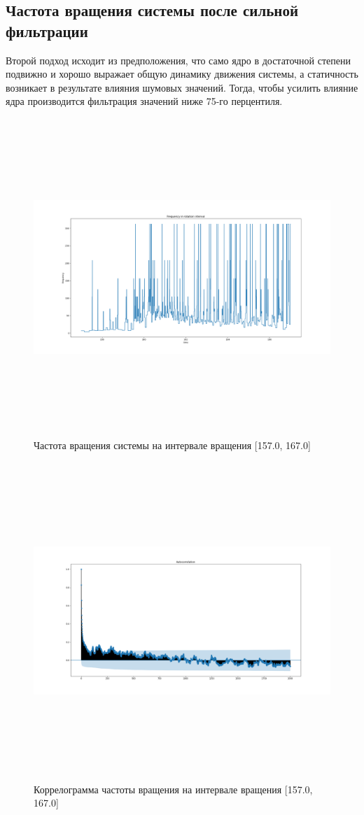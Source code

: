 \documentclass[a4paper,12pt]{article} %
\begin{document}
	\subsection{Частота вращения системы после сильной фильтрации}
	Второй подход исходит из предположения, что само ядро в достаточной степени подвижно и хорошо выражает общую динамику движения системы, а статичность возникает в результате влияния шумовых значений. Тогда, чтобы усилить влияние ядра производится  фильтрация значений ниже 75-го перцентиля.
	\begin{figure}[H]
		\includegraphics[width = 18cm, height = 12cm]{Rot_filtered.png}
		\caption{Частота вращения системы на интервале вращения [157.0, 167.0]}
		\label{fig:rot_filtered}
	\end{figure}

	\begin{figure}[H]
		\includegraphics[width = 18cm, height = 12cm]{autocor_rot_filtered.png}
		\caption{Коррелограмма частоты вращения на интервале вращения [157.0, 167.0]}
		\label{fig:autocor_rot_filtered}
	\end{figure}
\end{document}
